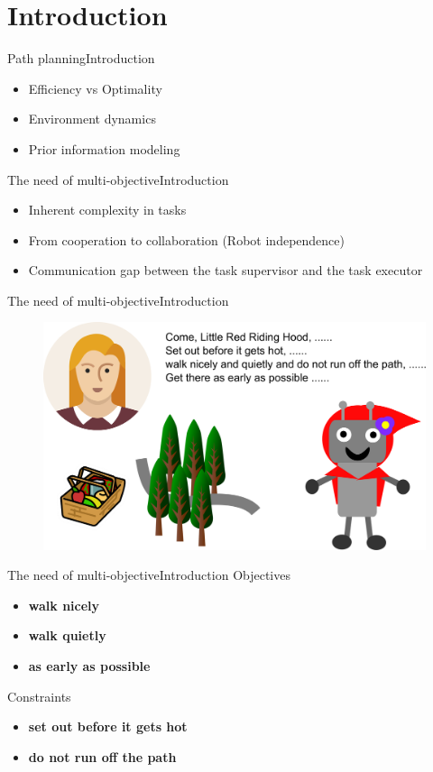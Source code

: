 \section{Introduction}

\begin{frame}{Path planning}{Introduction}
\begin{itemize}
\item Efficiency vs Optimality
\item Environment dynamics
\item Prior information modeling
\end{itemize}
\end{frame}

\begin{frame}{The need of multi-objective}{Introduction}
\begin{itemize}
\item Inherent complexity in tasks
\item From cooperation to collaboration (Robot independence)
\item Communication gap between the task supervisor and the task executor
\end{itemize}
\end{frame}

\begin{frame}{The need of multi-objective}{Introduction}
	\begin{figure}
		\centering
		\includegraphics[width=\linewidth]{figure/task_assign}
		\label{fig:task_assign}
	\end{figure}
\end{frame}

\begin{frame}{The need of multi-objective}{Introduction}
Objectives
\begin{itemize}
\item \textbf{walk nicely}
\item \textbf{walk quietly}
\item \textbf{as early as possible}
\end{itemize}
Constraints
\begin{itemize}
\item  \textbf{set out before it gets hot}
\item \textbf{do not run off the path}
\end{itemize}
\end{frame}

